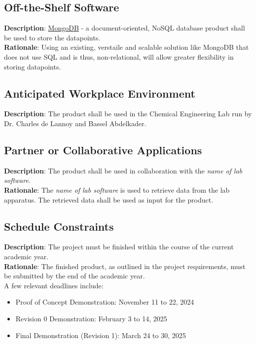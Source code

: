 \documentclass[12pt]{article}
\begin{document}
\subsection{Off-the-Shelf Software}
\textbf{Description}: \href{https://www.mongodb.com/}{MongoDB} - a
document-oriented, NoSQL database product shall be used to store the
datapoints.\\
\textbf{Rationale}: Using an existing, verstaile and scalable solution like
MongoDB that does not use SQL and is thus, non-relational, will allow greater
flexibility in storing datapoints.\\

\subsection{Anticipated Workplace Environment}
\textbf{Description}: The product shall be used in the Chemical Engineering Lab
run by Dr. Charles de Lannoy and Bassel Abdelkader.

\subsection{Partner or Collaborative Applications}
\textbf{Description}: The product shall be used in collaboration with the
\emph{name of lab software}.\\
\textbf{Rationale}: The \emph{name of lab software} is used to retrieve data
from the lab apparatus. The retrieved data shall be used as input for the
product.

\subsection{Schedule Constraints}
\textbf{Description}: The project must be finished within the course of the
current academic year.\\
\textbf{Rationale}: The finished product, as outlined in the project
requirements, must be submitted by the end of the academic year.\\
\newline
A few relevant deadlines include:
\begin{itemize}
  \item Proof of Concept Demonstration: November 11 to 22, 2024
  \item Revision 0 Demonstration: February 3 to 14, 2025
  \item Final Demonstration (Revision 1): March 24 to 30, 2025
\end{itemize}
\end{document}
